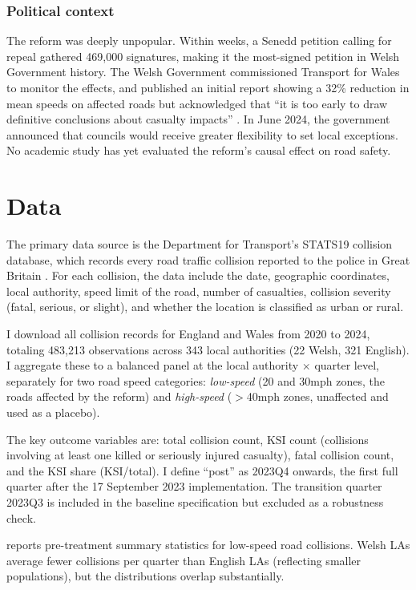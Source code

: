 \documentclass[12pt]{article}
\begin{document}
\subsubsection*{Political context} The reform was deeply unpopular. Within weeks, a Senedd petition calling for repeal gathered 469,000 signatures, making it the most-signed petition in Welsh Government history. The Welsh Government commissioned Transport for Wales to monitor the effects, and published an initial report showing a 32\% reduction in mean speeds on affected roads but acknowledged that ``it is too early to draw definitive conclusions about casualty impacts'' \citep{welsh2024monitoring}. In June 2024, the government announced that councils would receive greater flexibility to set local exceptions. No academic study has yet evaluated the reform's causal effect on road safety.

\section{Data}

The primary data source is the Department for Transport's STATS19 collision database, which records every road traffic collision reported to the police in Great Britain \citep{dft2024stats19}. For each collision, the data include the date, geographic coordinates, local authority, speed limit of the road, number of casualties, collision severity (fatal, serious, or slight), and whether the location is classified as urban or rural.

I download all collision records for England and Wales from 2020 to 2024, totaling 483,213 observations across 343 local authorities (22 Welsh, 321 English). I aggregate these to a balanced panel at the local authority $\times$ quarter level, separately for two road speed categories: \emph{low-speed} (20 and 30mph zones, the roads affected by the reform) and \emph{high-speed} ($>$40mph zones, unaffected and used as a placebo).

The key outcome variables are: total collision count, KSI count (collisions involving at least one killed or seriously injured casualty), fatal collision count, and the KSI share (KSI/total). I define ``post'' as 2023Q4 onwards, the first full quarter after the 17 September 2023 implementation. The transition quarter 2023Q3 is included in the baseline specification but excluded as a robustness check.



 reports pre-treatment summary statistics for low-speed road collisions. Welsh LAs average fewer collisions per quarter than English LAs (reflecting smaller populations), but the distributions overlap substantially.
\end{document}
